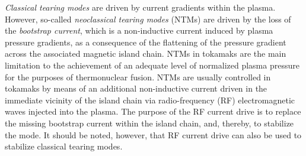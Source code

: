 \documentclass[12pt,prb,aps]{revtex4-1}
\begin{document}
{\em Classical tearing modes}\/ are driven by current gradients within the plasma.\cite{fkr} However,
so-called {\em neoclassical tearing modes}\/ (NTMs) are driven by the loss of the {\em bootstrap current}, which is a non-inductive current induced by plasma pressure gradients,\cite{boot} as a consequence of  the
flattening of the pressure gradient across the associated magnetic island chain.\cite{carrera}
NTMs in tokamaks are the main limitation to the achievement of an adequate level of normalized plasma pressure for the
purposes of thermonuclear fusion.\cite{buttery}
NTMs are usually controlled in tokamaks by means of an additional non-inductive current driven in the immediate
vicinity of the island chain via radio-frequency (RF) electromagnetic waves injected into the plasma.\cite{buttery,lahaye} The purpose of the RF current
drive is to replace the missing bootstrap current within the island chain, and, thereby, to stabilize the
 mode.\cite{westerhof} It should be noted, however, that RF current drive can also be used to
 stabilize classical tearing modes.\cite{westerhof}
 
\end{document}
